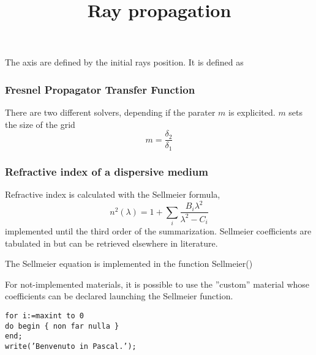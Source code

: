 \documentclass{book}
\begin{document}
\title{Ray propagation}
\maketitle

\lstset{language=Python}
The axis are defined by the initial rays position. It is defined as 
\subsubsection{Fresnel Propagator Transfer Function}
There are two different solvers, depending if the parater $m$ is explicited. $m$ sets the size of the grid 
\begin{equation}
m=\frac{\delta_2}{\delta_1}
\end{equation}
	
\subsubsection{Refractive index of a dispersive medium}
Refractive index is calculated with the Sellmeier formula, 
\begin{equation}
n^2 \left( \lambda \right)  = 1 + \sum_{i} \frac{B_i \lambda^2}{\lambda^2 - C_i}
\end{equation}
implemented until the third order of the summarization. Sellmeier coefficients are tabulated in 
but can be retrieved elsewhere in literature.

The Sellmeier equation is implemented in the function Sellmeier()

For not-implemented materials, it is possible to use the ''custom'' material whose coefficients can be declared launching the Sellmeier function.

\begin{lstlisting}[caption={Un codice in display.},label=lst:display]
for i:=maxint to 0 
do begin { non far nulla }
end;
write(’Benvenuto in Pascal.’); 
\end{lstlisting} 

%
\end{document}
